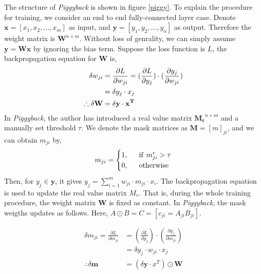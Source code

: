 The structure of \textit{Piggyback} is shown in figure \ref{piggy}. To explain the procedure for training, we consider an end to end fully-connected layer case. Denote $\mathbf{x}=[x_1, x_2, ..., x_m]$ as input, and $\mathbf{y}=[y_1, y_2, ..., y_n]$ as output. Therefore the weight matrix is $\mathbf{W}^{n\times m}$. Without loss of genrality, we can simply assume $\mathbf{y}=\mathbf{W}\mathbf{x}$ by ignoring the bias term. Suppose the loss function is $L$, the backpropagation equation for $\mathbf{W}$ is,
\begin{equation}
\centering
\begin{aligned}
\delta w_{ji}&=\frac{\partial L}{\partial w_{ji}} = (\frac{\partial L}{\partial y_j})\cdot (\frac{\partial y_j}{\partial w_{ji}}) \\
&= \delta y_j \cdot x_j \\
\therefore \delta \mathbf{W} &= \delta \mathbf{y} \cdot  \mathbf{x^T} \\
\end{aligned}
\end{equation}
In \textit{Piggyback}, the author has introduced a real value matrix $\mathbf{M_r}^{n\times m}$ and a manually set threshold $\tau$. We denote the mask matrices as $\mathbf{M}=[m]_{ji}$, and we can obtain $m_{ji}$ by,
\begin{equation}
m_{ji}=\begin{cases}
1,\ \ &{\rm if}\ m^r_{ji}>\tau \\
0,\ \ &{\rm otherwise} \\
\end{cases}
\end{equation}
Then, for $y_j\in\mathbf{y}$, it gives $y_j=\sum_{i=1}^m w_{ji}\cdot m_{ji} \cdot x_i$. The backpropagation equation is used to update the real value matrix $M_r$. That is, during the whole training procedure, the weight matrix $\mathbf{W}$ is fixed as constant. In \textit{Piggyback}, the mask weigths updates as follows. Here, $A\odot B = C=[c_{ji}=A_{ji}B_{ji}]$. 

\begin{equation}
\begin{aligned}
\delta m_{ji}=\frac{\partial L}{\partial m_{ji}} &= (\frac{\partial L}{\partial y_j})\cdot (\frac{\partial y_j}{\partial m_{ji}}) \\
&= \delta y_j \cdot w_{ji} \cdot x_j \\
\therefore \delta \mathbf{m} &= (\delta \mathbf{y} \cdot x^T) \odot \mathbf{W} \\
\end{aligned}
\end{equation}
